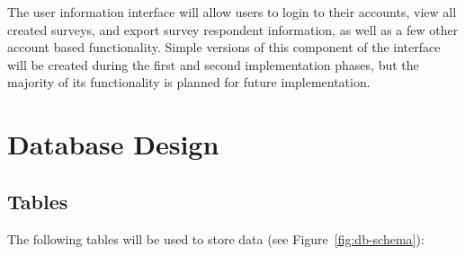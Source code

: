 \documentclass{article}
\begin{document}
The user information interface will allow users to login to their
accounts, view all created surveys, and export survey respondent
information, as well as a few other account based functionality.
Simple versions of this component of the interface will be created
during the first and second implementation phases, but the majority of
its functionality is planned for future implementation.


\section{Database Design}
\label{sec:database-design}

\begin{sidewaysfigure}
  \texttt{[image: \{\{relationships.real.large]}}}
  \caption{Database Schema}
  \label{fig:db-schema}
\end{sidewaysfigure}

\subsection{Tables}
\label{sec:db-tables}

The following tables will be used to store data (see
Figure~\ref{fig:db-schema}):
\end{document}
